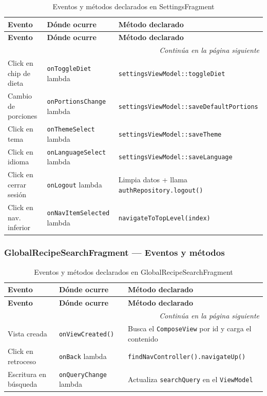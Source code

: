 \documentclass[stu, 12pt, letterpaper, donotrepeattitle, floatsintext, natbib]{apa7}
\begin{document}
\begin{longtable}{@{}p{2.5cm}p{4cm}p{9cm}@{}}
\caption{Eventos y métodos declarados en SettingsFragment}
\label{tab:evsettings}\\
\toprule
\textbf{Evento} & \textbf{Dónde ocurre} & \textbf{Método declarado} \\
\midrule
\endfirsthead
\toprule
\textbf{Evento} & \textbf{Dónde ocurre} & \textbf{Método declarado} \\
\midrule
\endhead
\midrule
\multicolumn{3}{r}{\small\textit{Continúa en la página siguiente}}\\
\endfoot
\bottomrule
\endlastfoot
Click en chip de dieta & \texttt{onToggleDiet} lambda & \texttt{settingsViewModel::toggleDiet} \\[3pt]
Cambio de porciones & \texttt{onPortionsChange} lambda & \texttt{settingsViewModel::saveDefaultPortions} \\[3pt]
Click en tema & \texttt{onThemeSelect} lambda & \texttt{settingsViewModel::saveTheme} \\[3pt]
Click en idioma & \texttt{onLanguageSelect} lambda & \texttt{settingsViewModel::saveLanguage} \\[3pt]
Click en cerrar sesión & \texttt{onLogout} lambda & Limpia datos + llama \texttt{authRepository.logout()} \\[3pt]
Click en nav. inferior & \texttt{onNavItemSelected} lambda & \texttt{navigateToTopLevel(index)} \\
\end{longtable}

\subsubsection{GlobalRecipeSearchFragment --- Eventos y métodos}

\begin{longtable}{@{}p{2.5cm}p{4cm}p{9cm}@{}}
\caption{Eventos y métodos declarados en GlobalRecipeSearchFragment}
\label{tab:evglobalsearch}\\
\toprule
\textbf{Evento} & \textbf{Dónde ocurre} & \textbf{Método declarado} \\
\midrule
\endfirsthead
\toprule
\textbf{Evento} & \textbf{Dónde ocurre} & \textbf{Método declarado} \\
\midrule
\endhead
\midrule
\multicolumn{3}{r}{\small\textit{Continúa en la página siguiente}}\\
\endfoot
\bottomrule
\endlastfoot
Vista creada & \texttt{onViewCreated()} & Busca el \texttt{ComposeView} por id y carga el contenido \\[3pt]
Click en retroceso & \texttt{onBack} lambda & \texttt{findNavController().navigateUp()} \\[3pt]
Escritura en búsqueda & \texttt{onQueryChange} lambda & Actualiza \texttt{searchQuery} en el \texttt{ViewModel} \\
\end{longtable}
\end{document}
